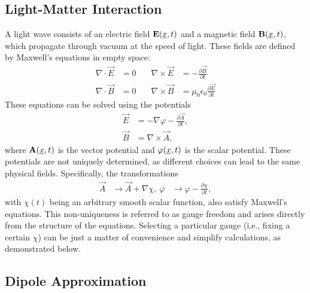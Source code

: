 \subsection{Light-Matter Interaction}
A light wave consists of an electric field $\mathbf{E}(\underline{x},t)$ and a magnetic field $\mathbf{B}(\underline{x},t)$, which propagate through vacuum at the speed of light. 
These fields are defined by Maxwell's equations in empty space:
\begin{equation*}
    \begin{aligned}
        \nabla \cdot \vec{E} &= 0 \quad & \nabla \times \vec{E} &= -\frac{\partial \vec{B}}{\partial t} \\
        \nabla \cdot \vec{B} &= 0 \quad & \nabla \times \vec{B} &= \mu_0\epsilon_0 \frac{\partial \vec{E}}{\partial t}
    \end{aligned}
\end{equation*}
These equations can be solved using the potentials
\begin{equation}
    \begin{aligned}
        \vec{E} &= -\nabla \varphi - \frac{\partial \vec{A}}{\partial t}, \\ \label{eq:potentials}
        \vec{B} &= \nabla \times \vec{A},
    \end{aligned}
\end{equation}
where $\mathbf{A}(\underline{x}, t)$ is the vector potential and $\varphi(\underline{x}, t)$ is the scalar potential. 
These potentials are not uniquely determined, as different choices can lead to the same physical fields. 
Specifically, the transformations
\begin{equation}
    \begin{aligned}
        \vec{A} &\to \vec{A} + \nabla \chi, \
        \varphi &\to \varphi - \frac{\partial \chi}{\partial t},
    \end{aligned}
\end{equation}
with $\chi(t)$ being an arbitrary smooth scalar function, also satisfy Maxwell's equations. 
This non-uniqueness is referred to as gauge freedom and arises directly from the structure of the equations. 
Selecting a particular gauge (i.e., fixing a certain $\chi$) can be just a matter of convenience and simplify calculations, as demonstrated below.






\subsection{Dipole Approximation}

